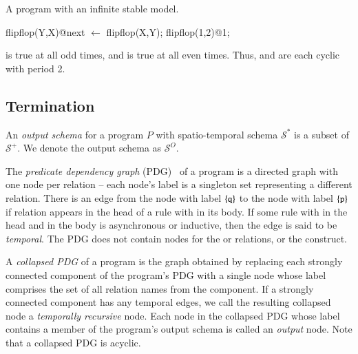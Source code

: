 \begin{example}
\label{ex:flipflop}
A \lang program with an infinite stable model.

\begin{Dedalus}
flipflop(Y,X)@next \(\leftarrow\) flipflop(X,Y);
flipflop(1,2)@1;
\end{Dedalus}

 is true at all odd times, and  is true at all even times.  Thus,  and  are each cyclic with period 2.
\end{example}


\subsection{Termination}

An {\em output schema} for a \lang program $P$ with spatio-temporal schema $\mathcal{S}^*$ is a subset of $\mathcal{S}^+$.  We denote the output schema as $\mathcal{S}^O$.

The {\em predicate dependency graph} (PDG)~\cite{ullmanbook} of a \lang program is a directed graph with one node per relation -- each node's label is a singleton set representing a different relation.  There is an edge from the node with label $\{\dedalus{q}\}$ to the node with label $\{\dedalus{p}\}$ if relation  appears in the head of a rule with  in its body.  If some rule with  in the head and  in the body is asynchronous or inductive, then the edge is said to be {\em temporal}. 
The PDG does not contain nodes for the  or  relations, or the  construct.

A {\em collapsed PDG} of a \lang program is the graph obtained by replacing each strongly connected component of the program's PDG with a single node whose label comprises the set of all relation names from the component.
If a strongly connected component has any temporal edges, we call the resulting collapsed node a {\em temporally recursive} node.  Each node in the collapsed PDG whose label contains a member of the program's output schema is called an {\em output} node.  Note that a collapsed PDG is acyclic.

